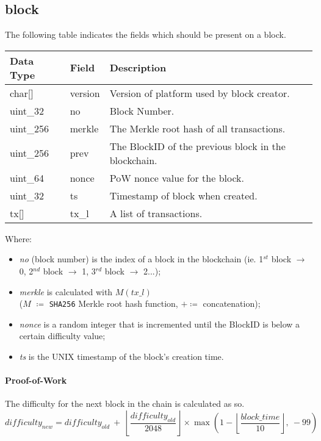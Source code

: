 \documentclass{article}
\begin{document}
\subsection{block}
The following table indicates the fields which should be present on a block.
\begin{table}[H]
\centering
\begin{tabular}{|p{1.3cm}|p{2.5cm}|p{5.5cm}|}
\hline
\rowcolor{tblgrey} 
Data Type   & Field      & Description                            \\ \hline
char[\hspace{0.05cm}]  & version     & Version of platform used by block creator.          \\ \hline
uint\_32    & no          & Block Number.                                       \\ \hline
uint\_256   & merkle      & The Merkle root hash of all transactions.  \\ \hline
uint\_256   & prev        & The BlockID of the previous block in the blockchain.   \\ \hline
uint\_64    & nonce       & PoW nonce value for the block.                      \\ \hline
uint\_32    & ts          & Timestamp of block when created.                    \\ \hline
tx[\hspace{0.05cm}] & tx\_l       & A list of transactions.                            \\ \hline
\end{tabular}
\end{table}
Where:
\begin{itemize}
    \item \textit{no} (block number) is the index of a block in the blockchain (ie. 1$^{st}$ block $\rightarrow$ 0, 2$^{nd}$ block $\rightarrow$ 1, 3$^{rd}$ block $\rightarrow$ 2...);
    \item \textit{merkle} is calculated with $M(\textit{tx\_l})$ \\
    ($M$ $\coloneqq$ \texttt{SHA256} Merkle root hash function, $+ \coloneqq$ concatenation); 
    \item \textit{nonce} is a random integer that is incremented until the BlockID is below a certain difficulty value;
    \item \textit{ts} is the UNIX timestamp of the block's creation time.
\end{itemize}


\paragraph{Proof-of-Work}
The difficulty for the next block in the chain is calculated as so.
\[\textit{difficulty}_{\textit{new}} = \textit{difficulty}_{\textit{old}}
\ + \ \left\lfloor\dfrac{\textit{difficulty}_{\textit{old}}}{2048}\right\rfloor \times \max\left(1- \left\lfloor \frac{\textit{block\_time}}{10} \right\rfloor,\ -99\right)\]
\end{document}
